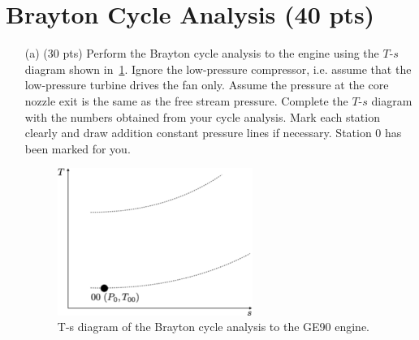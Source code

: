 \documentclass[11pt]{article}
\begin{document}
\section{Brayton Cycle Analysis (40 pts)}
\begin{itemize}
	\item[(a)] (30 pts) Perform the Brayton cycle analysis to the engine using the $T$-$s$ diagram shown in~\cref{fig:Ts}. Ignore the low-pressure compressor, i.e. assume that the low-pressure turbine drives the fan only. Assume the pressure at the core nozzle exit is the same as the free stream pressure. Complete the $T$-$s$ diagram with the numbers obtained from your cycle analysis. Mark each station clearly and draw addition constant pressure lines if necessary. Station 0 has been marked for you. 
	
	\begin{figure}[ht]
		\centering
		\includegraphics[width=0.6\textwidth]{Ts_diagram.pdf}
	    \caption{T-s diagram of the Brayton cycle analysis to the GE90 engine.}
		\label{fig:Ts}
	\end{figure}
	

\end{itemize}
\end{document}
